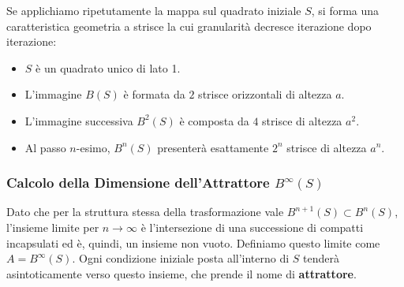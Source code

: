\documentclass[openany]{book}
\theoremstyle{definition}
\theoremstyle{remark}
\begin{document}
Se applichiamo ripetutamente la mappa sul quadrato iniziale $S$, si forma una caratteristica geometria a strisce la cui granularità decresce iterazione dopo iterazione:
\begin{itemize}
    \item $S$ è un quadrato unico di lato 1.
    \item L'immagine $B(S)$ è formata da $2$ strisce orizzontali di altezza $a$.
    \item L'immagine successiva $B^2(S)$ è composta da $4$ strisce di altezza $a^2$.
    \item Al passo $n$-esimo, $B^n(S)$ presenterà esattamente $2^n$ strisce di altezza $a^n$.
\end{itemize}

\begin{center}
\end{center}

\subsubsection*{Calcolo della Dimensione dell'Attrattore $B^\infty(S)$}
Dato che per la struttura stessa della trasformazione vale $B^{n+1}(S) \subset B^n(S)$, l'insieme limite per $n \to \infty$ è l'intersezione di una successione di compatti incapsulati ed è, quindi, un insieme non vuoto. Definiamo questo limite come $A = B^\infty(S)$. Ogni condizione iniziale posta all'interno di $S$ tenderà asintoticamente verso questo insieme, che prende il nome di \textbf{attrattore}.
\end{document}
